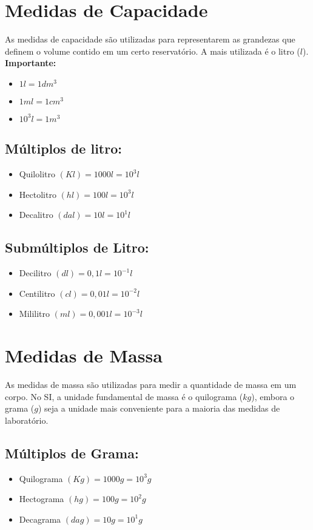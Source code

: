 \documentclass[11pt,fleqn]{book}
\begin{document}
\section{Medidas de Capacidade}
As medidas de capacidade são utilizadas para representarem
as grandezas que definem o volume contido em um certo
reservatório. A mais utilizada é o litro ($l$).
	\\\textbf{Importante:}
	\begin{itemize}
	    \item $1l = 1dm^3$
	    \item $1 ml = 1 cm^3$
	    \item $10^3 l = 1 m^3$
	\end{itemize}

	\subsection{Múltiplos de litro:}
		\begin{itemize}
		    \item Quilolitro $(Kl) = 1000 l = 10^3 l$
		    \item Hectolitro $(hl) = 100 l = 10^3 l$
		    \item Decalitro $(dal) = 10 l = 10^1l$
		\end{itemize}
	
	\subsection{Submúltiplos de Litro:}
		\begin{itemize}
		    \item Decilitro $(dl) = 0,1 l = 10^{-1}l$
		    \item Centilitro $(cl) = 0,01 l = 10^{-2}l$
		    \item Mililitro $(ml) = 0,001 l = 10^{-3}l$
		\end{itemize}
	
\section{Medidas de Massa}
As medidas de massa são utilizadas para medir a quantidade
de massa em um corpo. No SI, a unidade fundamental de massa é
o quilograma ($kg$), embora o grama ($g$) seja a unidade mais
conveniente para a maioria das medidas de laboratório.
	\subsection{Múltiplos de Grama:}
		\begin{itemize}
		    \item Quilograma $(Kg) = 1000 g = 10^3 g$
		    \item Hectograma $(hg) = 100 g = 10^2 g$
		    \item Decagrama $(dag) = 10 g = 10^1 g$
		\end{itemize}
	
\end{document}

